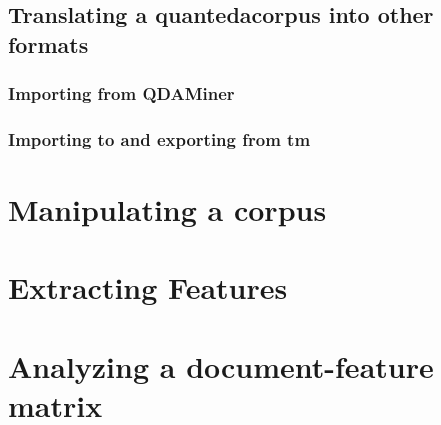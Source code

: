 \documentclass[11pt]{article}\usepackage[]{graphicx}\usepackage[]{color}
\newcommand{\quanteda}{\textsf{quanteda}}
\begin{document}
\subsection{Translating a \quanteda corpus into other formats}

\subsubsection{Importing from QDAMiner}

\subsubsection{Importing to and exporting from \textsf{tm}}


\section{Manipulating a corpus}


\section{Extracting Features}


\section{Analyzing a document-feature matrix}


\end{document}
